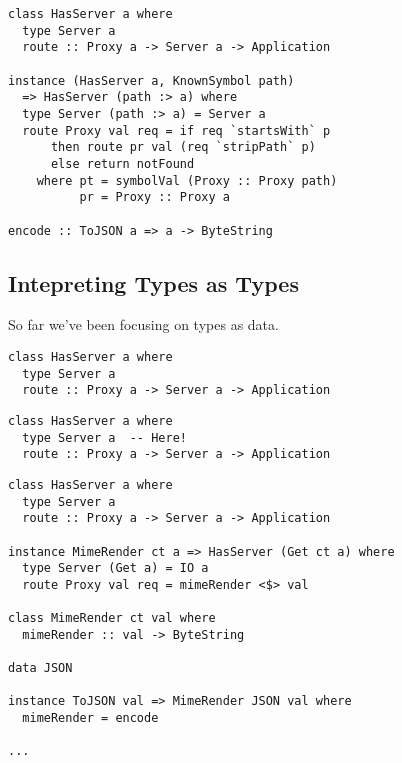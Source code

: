 \documentclass{beamer}
\begin{document}
\begin{frame}[fragile]
\begin{verbatim}
class HasServer a where
  type Server a
  route :: Proxy a -> Server a -> Application

instance (HasServer a, KnownSymbol path)
  => HasServer (path :> a) where
  type Server (path :> a) = Server a
  route Proxy val req = if req `startsWith` p
      then route pr val (req `stripPath` p)
      else return notFound
    where pt = symbolVal (Proxy :: Proxy path)
          pr = Proxy :: Proxy a

encode :: ToJSON a => a -> ByteString
\end{verbatim}
\end{frame}

\subsection{Intepreting Types as Types} %

\begin{frame}
So far we've been focusing on types as data.
\end{frame}

\begin{frame}[fragile]
\begin{verbatim}
class HasServer a where
  type Server a
  route :: Proxy a -> Server a -> Application

\end{verbatim}
\end{frame}

\begin{frame}[fragile]
\begin{verbatim}
class HasServer a where
  type Server a  -- Here!
  route :: Proxy a -> Server a -> Application

\end{verbatim}
\end{frame}

\begin{frame}[fragile]
\begin{verbatim}
class HasServer a where
  type Server a
  route :: Proxy a -> Server a -> Application

instance MimeRender ct a => HasServer (Get ct a) where
  type Server (Get a) = IO a
  route Proxy val req = mimeRender <$> val

class MimeRender ct val where
  mimeRender :: val -> ByteString

data JSON

instance ToJSON val => MimeRender JSON val where
  mimeRender = encode

...
\end{verbatim}
\end{frame}
\end{document}
